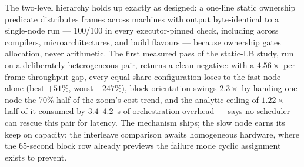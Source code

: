 \documentclass[
	english,
	letterpaper, oneside
]{article}
\begin{document}
The two-level hierarchy holds up exactly as designed: a one-line static
ownership predicate distributes frames across machines with output
byte-identical to a single-node run --- 100/100 in every executor-pinned
check, including across compilers, microarchitectures, and build flavours
--- because ownership gates allocation, never arithmetic. The first
measured pass of the static-LB study, run on a deliberately heterogeneous
pair, returns a clean negative: with a $4.56\times$ per-frame throughput
gap, every equal-share configuration loses to the fast node alone (best
$+51\%$, worst $+247\%$), block orientation swings $2.3\times$ by handing
one node the 70\% half of the zoom's cost trend, and the analytic ceiling
of $1.22\times$ --- half of it consumed by $3.4$--$4.2$~s of orchestration
overhead --- says no scheduler can rescue this pair for latency. The
mechanism ships; the slow node earns its keep on capacity; the interleave
comparison awaits homogeneous hardware, where the $65$-second block row
already previews the failure mode cyclic assignment exists to prevent.
\end{document}
